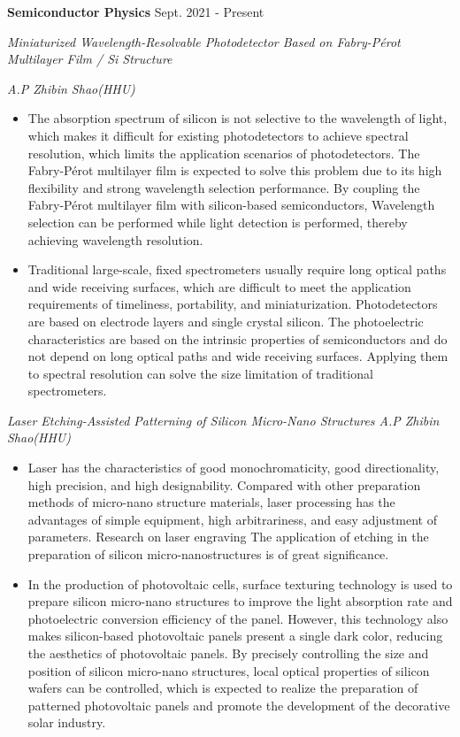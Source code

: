 \documentclass[12pt]{article}
\begin{document}
\medskip \textbf{Semiconductor Physics} \hfill Sept. 2021 - Present

\quad  \textit{Miniaturized Wavelength-Resolvable Photodetector Based on Fabry-P\'{e}rot Multilayer Film / Si Structure}

\hfill \textit{A.P Zhibin Shao(HHU)}

\begin{itemize}[noitemsep,nolistsep]
    \item The absorption spectrum of silicon is not selective to the wavelength of light, which makes it difficult for existing photodetectors to achieve spectral resolution, which limits the application scenarios of photodetectors. The Fabry-P\'{e}rot multilayer film is expected to solve this problem due to its high flexibility and strong wavelength selection performance. By coupling the Fabry-P\'{e}rot multilayer film with silicon-based semiconductors, Wavelength selection can be performed while light detection is performed, thereby achieving wavelength resolution.
    \item Traditional large-scale, fixed spectrometers usually require long optical paths and wide receiving surfaces, which are difficult to meet the application requirements of timeliness, portability, and miniaturization. Photodetectors are based on electrode layers and single crystal silicon. The photoelectric characteristics are based on the intrinsic properties of semiconductors and do not depend on long optical paths and wide receiving surfaces. Applying them to spectral resolution can solve the size limitation of traditional spectrometers.
\end{itemize}

\quad  \textit{Laser Etching-Assisted Patterning of Silicon Micro-Nano Structures \hfill A.P Zhibin Shao(HHU)}

\begin{itemize}[noitemsep,nolistsep]
    \item Laser has the characteristics of good monochromaticity, good directionality, high precision, and high designability. Compared with other preparation methods of micro-nano structure materials, laser processing has the advantages of simple equipment, high arbitrariness, and easy adjustment of parameters. Research on laser engraving The application of etching in the preparation of silicon micro-nanostructures is of great significance.
    \item In the production of photovoltaic cells, surface texturing technology is used to prepare silicon micro-nano structures to improve the light absorption rate and photoelectric conversion efficiency of the panel. However, this technology also makes silicon-based photovoltaic panels present a single dark color, reducing the aesthetics of photovoltaic panels. By precisely controlling the size and position of silicon micro-nano structures, local optical properties of silicon wafers can be controlled, which is expected to realize the preparation of patterned photovoltaic panels and promote the development of the decorative solar industry.
\end{itemize}
\end{document}
